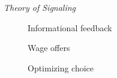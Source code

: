 \begin{frame}\begin{center}
		\LARGE\textit{Theory of Signaling}
\end{center}\end{frame}
\begin{frame}\begin{figure}[htp]\centering
\caption{Informational feedback}
\end{figure}\end{frame}
\begin{frame}\begin{figure}[htp]\centering
\caption{Wage offers}
\end{figure}\end{frame}
\begin{frame}\begin{figure}[htp]\centering
\caption{Optimizing choice}
\end{figure}\end{frame}
